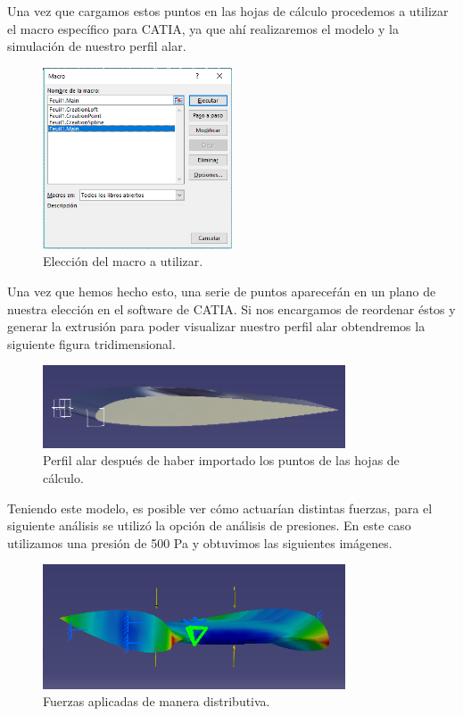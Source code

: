 \documentclass[12pt, letterpaper]{article}
\begin{document}
Una vez que cargamos estos puntos en las hojas de cálculo procedemos a utilizar el macro específico para CATIA, ya que ahí realizaremos el modelo y la simulación de nuestro perfil alar.

\begin{figure}[H]
	\centering
	\includegraphics[width=0.5\textwidth]{macro.png}
	\caption{Elección del macro a utilizar.}
\end{figure}

Una vez que hemos hecho esto, una serie de puntos apareceŕán en un plano de nuestra elección en el software de CATIA. Si nos encargamos de reordenar éstos y generar la extrusión para poder visualizar nuestro perfil alar obtendremos la siguiente figura tridimensional.

\begin{figure}[H]
	\centering
	\includegraphics[width=0.8\textwidth]{perfil.png}
	\caption{Perfil alar después de haber importado los puntos de las hojas de cálculo.}
\end{figure}

Teniendo este modelo, es posible ver cómo actuarían distintas fuerzas, para el siguiente análisis se utilizó la opción de análisis de presiones. En este caso utilizamos una presión de 500 Pa  y obtuvimos las siguientes imágenes.

\begin{figure}[H]
	\centering
	\includegraphics[width=0.8\textwidth]{forces.png}
	\caption{Fuerzas aplicadas de manera distributiva.}
\end{figure}
\end{document}
